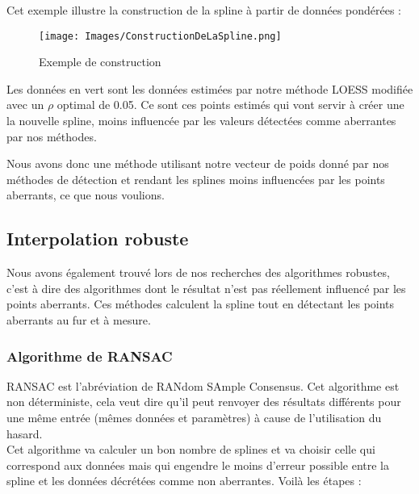 \documentclass[a4paper,12pt]{article} %
\begin{document}
					    Cet exemple illustre la construction de la spline à partir de données pondérées :
					   
    			        \begin{figure}[H]
                            \centering
                            \texttt{[image: Images/ConstructionDeLaSpline.png]}
                            \caption{Exemple de construction}
                            \label{fig:exemple}
                        \end{figure}
                        
                       Les données en vert sont les données estimées par notre méthode LOESS modifiée avec un $\rho $ optimal de 0.05.  Ce sont  ces points estimés qui vont servir à créer une la nouvelle spline, moins influencée par les valeurs détectées comme aberrantes par nos méthodes.
                        
                       Nous avons donc une méthode utilisant notre vecteur de poids donné par nos méthodes de détection et rendant les splines moins influencées par les points aberrants, ce que nous voulions.
					    
			\subsection{Interpolation robuste}
        		
        		Nous avons également trouvé lors de nos recherches des algorithmes robustes, c'est à dire des algorithmes dont le résultat n'est pas réellement influencé par les points aberrants. Ces méthodes calculent la spline tout en détectant les points aberrants au fur et à mesure.
        		
			    \subsubsection{Algorithme de RANSAC}
    			   
                    RANSAC est l'abréviation de RANdom SAmple Consensus. Cet algorithme est non déterministe, cela veut dire qu'il peut renvoyer des résultats différents pour une même entrée (mêmes données et paramètres) à cause de l'utilisation du hasard.\\
                    Cet algorithme va calculer un bon nombre de splines et va choisir celle qui correspond aux données mais qui engendre le moins d'erreur possible entre la spline et les données décrétées comme non aberrantes. Voilà les étapes :\\
                    
\end{document}
